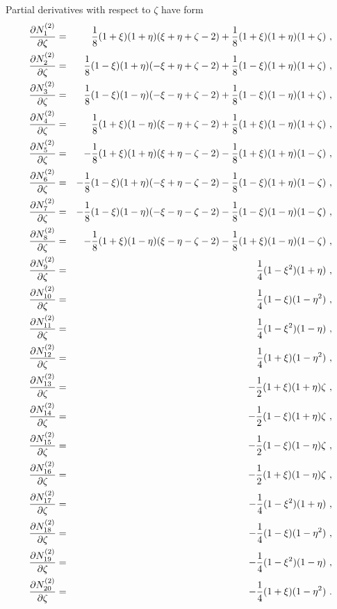 Partial derivatives with respect to $\zeta$ have form
\begin{eqnarray}
\label{bfquadhexdz1}
\ppd{N_{1}^{(2)}}{\zeta} &=& \del{1}{8} (1 + \xi) (1 + \eta)
(\xi + \eta + \zeta - 2) + \del{1}{8} (1 + \xi) (1 + \eta) (1 + \zeta)\ ,
\\ \label{bfquadhexdz2}
\ppd{N_{2}^{(2)}}{\zeta} &=& \del{1}{8} (1 - \xi) (1 + \eta)
(- \xi + \eta + \zeta - 2) + \del{1}{8} (1 - \xi) (1 + \eta) (1 + \zeta)\ ,
\\ \label{bfquadhexdz3}
\ppd{N_{3}^{(2)}}{\zeta} &=& \del{1}{8} (1 - \xi) (1 - \eta)
(- \xi - \eta + \zeta - 2) + \del{1}{8} (1 - \xi) (1 - \eta) (1 + \zeta)\ ,
\\ \label{bfquadhexdz4}
\ppd{N_{4}^{(2)}}{\zeta} &=& \del{1}{8} (1 + \xi) (1 - \eta)
(\xi - \eta + \zeta - 2) + \del{1}{8} (1 + \xi) (1 - \eta) (1 + \zeta)\ ,
\\ \label{bfquadhexdz5}
\ppd{N_{5}^{(2)}}{\zeta} &=& - \del{1}{8} (1 + \xi) (1 + \eta)
(\xi + \eta - \zeta - 2) - \del{1}{8} (1 + \xi) (1 + \eta) (1 - \zeta)\ ,
\\ \label{bfquadhexdz6}
\ppd{N_{6}^{(2)}}{\zeta} &=& - \del{1}{8} (1 - \xi) (1 + \eta)
(- \xi + \eta - \zeta - 2) - \del{1}{8} (1 - \xi) (1 + \eta) (1 - \zeta)\ ,
\\ \label{bfquadhexdz7}
\ppd{N_{7}^{(2)}}{\zeta} &=& - \del{1}{8} (1 - \xi) (1 - \eta)
(- \xi - \eta - \zeta - 2) - \del{1}{8} (1 - \xi) (1 - \eta) (1 - \zeta)\ ,
\\ \label{bfquadhexdz8}
\ppd{N_{8}^{(2)}}{\zeta} &=& - \del{1}{8} (1 + \xi) (1 - \eta)
(\xi - \eta - \zeta - 2) - \del{1}{8} (1 + \xi) (1 - \eta) (1 - \zeta)\ ,
\\ \label{bfquadhexdz9}
\ppd{N_{9}^{(2)}}{\zeta} &=& \del{1}{4} (1 - \xi^2) (1 + \eta)\ ,
\\ \label{bfquadhexdz10}
\ppd{N_{10}^{(2)}}{\zeta} &=& \del{1}{4} (1 - \xi) (1 - \eta^2)\ ,
\\ \label{bfquadhexdz11}
\ppd{N_{11}^{(2)}}{\zeta} &=& \del{1}{4} (1 - \xi^2) (1 - \eta)\ ,
\\ \label{bfquadhexdz12}
\ppd{N_{12}^{(2)}}{\zeta} &=& \del{1}{4} (1 + \xi) (1 - \eta^2)\ ,
\\ \label{bfquadhexdz13}
\ppd{N_{13}^{(2)}}{\zeta} &=& - \del{1}{2} (1 + \xi) (1 + \eta) \zeta\ ,
\\ \label{bfquadhexdz14}
\ppd{N_{14}^{(2)}}{\zeta} &=& - \del{1}{2} (1 - \xi) (1 + \eta) \zeta\ ,
\\ \label{bfquadhexdz15}
\ppd{N_{15}^{(2)}}{\zeta} &=& - \del{1}{2} (1 - \xi) (1 - \eta) \zeta\ ,
\\ \label{bfquadhexdz16}
\ppd{N_{16}^{(2)}}{\zeta} &=& - \del{1}{2} (1 + \xi) (1 - \eta) \zeta\ ,
\\ \label{bfquadhexdz17}
\ppd{N_{17}^{(2)}}{\zeta} &=& - \del{1}{4} (1 - \xi^2) (1 + \eta)\ ,
\\ \label{bfquadhexdz18}
\ppd{N_{18}^{(2)}}{\zeta} &=& - \del{1}{4} (1 - \xi) (1 - \eta^2)\ ,
\\ \label{bfquadhexdz19}
\ppd{N_{19}^{(2)}}{\zeta} &=& - \del{1}{4} (1 - \xi^2) (1 - \eta)\ ,
\\ \label{bfquadhexdz20}
\ppd{N_{20}^{(2)}}{\zeta} &=& - \del{1}{4} (1 + \xi) (1 - \eta^2)\ .
\end{eqnarray}

